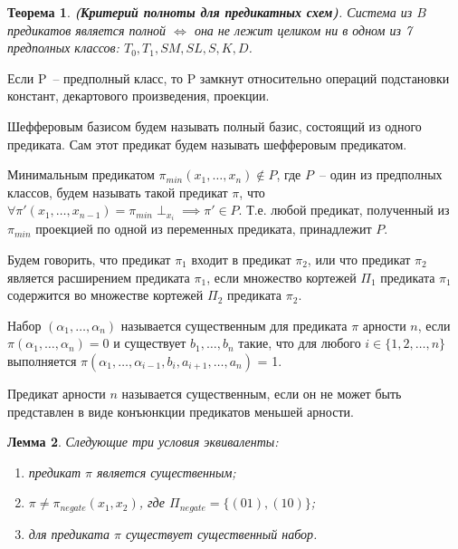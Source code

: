 \documentclass[12pt]{article}
\newtheorem{theorem}{Теорема}[section]
\newtheorem{lemma}[theorem]{Лемма}
\newenvironment{definition}[1][Определение]{\begin{trivlist}
\item[\hskip \labelsep {\bfseries #1}]}{\end{trivlist}}
\newenvironment{remark}[1][Замечание]{\begin{trivlist}
\item[\hskip \labelsep {\bfseries #1}]}{\end{trivlist}}
\begin{document}
\begin{theorem}
\textbf{(Критерий полноты для предикатных схем)}. Система из $B$ предикатов является полной $\iff$
она не лежит целиком ни в одном из 7 предполных классов: $T_0, T_1, SM, SL, S, K, D$. \cite{Shu11} 
\end{theorem}

\begin{remark}
Если P~-- предполный класс, то P замкнут относительно операций подстановки констант,
декартового произведения, проекции.
\end{remark}


\begin{definition}
Шефферовым базисом будем называть полный базис, состоящий из одного предиката. Сам этот предикат
будем называть шефферовым предикатом.
\end{definition}

\begin{definition}
Минимальным предикатом $\pi_{min}(x_1, \dots, x_n) \notin P$, где $P$~-- один из предполных классов, будем называть такой 
предикат $\pi$, что $\forall \pi'(x_1, \dots, x_{n-1}) = \pi_{min} \perp_{x_i} \implies \pi' \in P$. Т.е. любой предикат,
полученный из $\pi_{min}$ проекцией по одной из переменных предиката, принадлежит $P$.
\end{definition}

\begin{definition}
Будем говорить, что предикат $\pi_1$ входит в предикат $\pi_2$, или что предикат $\pi_2$ является
расширением предиката $\pi_1$, если множество кортежей $\Pi_1$ предиката $\pi_1$ 
содержится во множестве кортежей $\Pi_2$ предиката $\pi_2$.
\end{definition}

\begin{definition}
Набор $(\alpha_1, \dots, \alpha_n)$ называется существенным для предиката $\pi$ арности $n$, если
$\pi(\alpha_1, \dots, \alpha_n) = 0$ и существует $b_1, \dots, b_n$ такие, что для любого $i \in \{ 1, 2, \dots, n\}$
выполняется 
$\pi(\alpha_1, \dots, \alpha_{i-1}, b_i, a_{i+1}, \dots, a_n)$ = 1.
\end{definition}

\begin{definition}
Предикат арности $n$ называется существенным, если он не может быть представлен в виде конъюнкции
предикатов меньшей арности.
\end{definition}

\begin{lemma}
Следующие три условия эквиваленты: 
\begin{enumerate}
\item предикат $\pi$ является существенным;
\item $\pi \neq \pi_{negate}(x_1, x_2)$, где $\Pi_{negate} = \{ (01), (10) \}$;
\item для предиката $\pi$ существует существенный набор. 
\end{enumerate}\cite{Zhuk}
\end{lemma}
\end{document}
